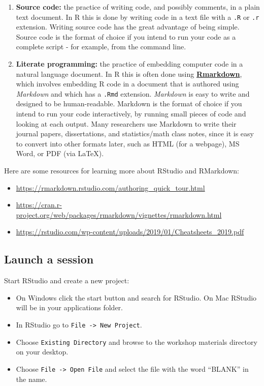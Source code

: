 \documentclass[
]{book}
\providecommand{\tightlist}{%
  \setlength{\itemsep}{0pt}\setlength{\parskip}{0pt}}
\begin{document}
\begin{enumerate}
\def\labelenumi{\arabic{enumi}.}
\item
  \textbf{Source code:} the practice of writing code, and possibly comments, in a plain text document. In R this is done by writing code in a text file with a \texttt{.R} or \texttt{.r} extension. Writing source code has the great advantage of being simple. Source code is the format of choice if you intend to run your code as a complete script - for example, from the command line.
\item
  \textbf{Literate programming:} the practice of embedding computer code in a natural language document. In R this is often done using \href{https://rmarkdown.rstudio.com/}{\textbf{Rmarkdown}}, which involves embedding R code in a document that is authored using \emph{Markdown} and which has a \texttt{.Rmd} extension. \emph{Markdown} is easy to write and designed to be human-readable. Markdown is the format of choice if you intend to run your code interactively, by running small pieces of code and looking at each output. Many researchers use Markdown to write their journal papers, dissertations, and statistics/math class notes, since it is easy to convert into other formats later, such as HTML (for a webpage), MS Word, or PDF (via LaTeX).
\end{enumerate}

Here are some resources for learning more about RStudio and RMarkdown:

\begin{itemize}
\tightlist
\item
  \url{https://rmarkdown.rstudio.com/authoring_quick_tour.html}
\item
  \url{https://cran.r-project.org/web/packages/rmarkdown/vignettes/rmarkdown.html}
\item
  \url{https://rstudio.com/wp-content/uploads/2019/01/Cheatsheets_2019.pdf}
\end{itemize}

\hypertarget{launch-a-session}{%
\subsection{Launch a session}\label{launch-a-session}}

Start RStudio and create a new project:

\begin{itemize}
\tightlist
\item
  On Windows click the start button and search for RStudio. On Mac
  RStudio will be in your applications folder.
\item
  In RStudio go to \texttt{File\ -\textgreater{}\ New\ Project}.
\item
  Choose \texttt{Existing\ Directory} and browse to the workshop materials directory on your desktop.
\item
  Choose \texttt{File\ -\textgreater{}\ Open\ File} and select the file with the word ``BLANK'' in the name.
\end{itemize}
\end{document}
